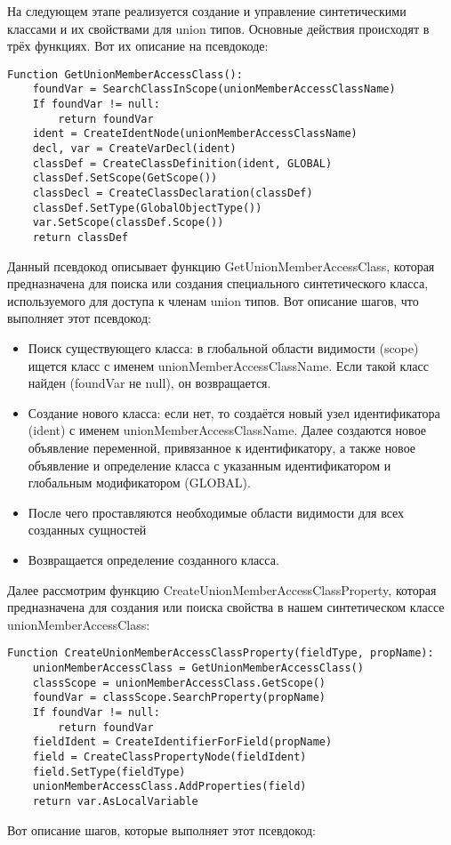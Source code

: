 На следующем этапе реализуется создание и управление синтетическими классами и их свойствами для union типов.
Основные действия происходят в трёх функциях.
Вот их описание на псевдокоде:

\begin{lstlisting}[label={lst:getUnionFieldClass}]
Function GetUnionMemberAccessClass():
    foundVar = SearchClassInScope(unionMemberAccessClassName)
    If foundVar != null:
        return foundVar
    ident = CreateIdentNode(unionMemberAccessClassName)
    decl, var = CreateVarDecl(ident)
    classDef = CreateClassDefinition(ident, GLOBAL)
    classDef.SetScope(GetScope())
    classDecl = CreateClassDeclaration(classDef)
    classDef.SetType(GlobalObjectType())
    var.SetScope(classDef.Scope())
    return classDef
\end{lstlisting}

Данный псевдокод описывает функцию GetUnionMemberAccessClass, которая предназначена для поиска или создания
специального синтетического класса, используемого для доступа к членам union типов.
Вот описание шагов, что выполняет этот псевдокод:

\begin{itemize}[left=2em]
    \item Поиск существующего класса: в глобальной области видимости (scope) ищется класс с именем
    unionMemberAccessClassName.
    Если такой класс найден (foundVar не null), он возвращается.
    \item Создание нового класса: если нет, то создаётся новый узел идентификатора (ident) с именем unionMemberAccessClassName.
    Далее создаются новое объявление переменной, привязанное к идентификатору, а также новое объявление и определение класса
    с указанным идентификатором и глобальным модификатором (GLOBAL).
    \item После чего проставляются необходимые области видимости для всех созданных сущностей
    \item Возвращается определение созданного класса.
\end{itemize}

Далее рассмотрим функцию CreateUnionMemberAccessClassProperty, которая предназначена для создания или поиска свойства
в нашем синтетическом классе unionMemberAccessClass:

\begin{lstlisting}[label={lst:UnionFieldClassProperty}]
Function CreateUnionMemberAccessClassProperty(fieldType, propName):
    unionMemberAccessClass = GetUnionMemberAccessClass()
    classScope = unionMemberAccessClass.GetScope()
    foundVar = classScope.SearchProperty(propName)
    If foundVar != null:
        return foundVar
    fieldIdent = CreateIdentifierForField(propName)
    field = CreateClassPropertyNode(fieldIdent)
    field.SetType(fieldType)
    unionMemberAccessClass.AddProperties(field)
    return var.AsLocalVariable
\end{lstlisting}
Вот описание шагов, которые выполняет этот псевдокод:

